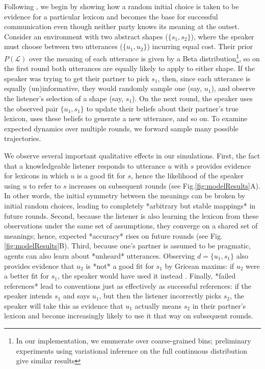 Following \cite{SmithGoodmanFrank13_RecursivePragmaticReasoningNIPS}, we begin by showing how a random initial choice is taken to be evidence for a particular lexicon and becomes the base for successful communication even though neither party knows its meaning at the outset.
Consider an environment with two abstract shapes ($\{s_1, s_2\}$), where the speaker must choose between two utterances ($\{u_1, u_2\}$) incurring equal cost. 
Their prior $P(\mathcal{L})$ over the meaning of each utterance is given by a Beta distribution\footnote{In our implementation, we enumerate over coarse-grained bins; preliminary experiments using variational inference on the full continuous distribution give similar results}, so on the first round both utterances are equally likely to apply to either shape. 
If the speaker was trying to get their partner to pick $s_1$, then, since each utterance is equally (un)informative, they would randomly sample one (say, $u_1$), and observe the listener's selection of a shape (say, $s_1$). 
On the next round, the speaker uses the observed pair $\{u_1, s_1\}$ to update their beliefs about their partner's true lexicon, uses these beliefs to generate a new utterance, and so on. 
To examine expected dynamics over multiple rounds, we forward sample many possible trajectories.

We observe several important qualitative effects in our simulations. 
First, the fact that a knowledgeable listener responds to utterance $u$ with $s$ provides evidence for lexicons in which $u$ is a good fit for $s$, hence the likelihood of the speaker using $u$ to refer to $s$ increases on subsequent rounds (see Fig.\ref{fig:modelResults}A). 
In other words, the initial symmetry between the meanings can be broken by initial random choices, leading to completely *arbitrary but stable mappings* in future rounds. Second, because the listener is also learning the lexicon from these observations under the same set of assumptions, they converge on a shared set of meanings; hence, expected *accuracy* rises on future rounds (see Fig. \ref{fig:modelResults}B). Third, because one's partner is assumed to be pragmatic, agents can also learn about *unheard* utterances. Observing $d = \{u_1, s_1\}$ also provides evidence that $u_2$ is *not* a good fit for $s_1$ by Gricean maxims: if $u_2$ were a better fit for $s_1$, the speaker would have used it instead \cite{Grice75_LogicConversation}. Finally, *failed references* lead to conventions just as effectively as successful references: if the speaker intends $s_1$ and says $u_1$, but then the listener incorrectly picks $s_2$, the speaker will take this as evidence that $u_1$ actually means $s_2$ in their partner's lexicon and become increasingly likely to use it that way on subsequent rounds.

